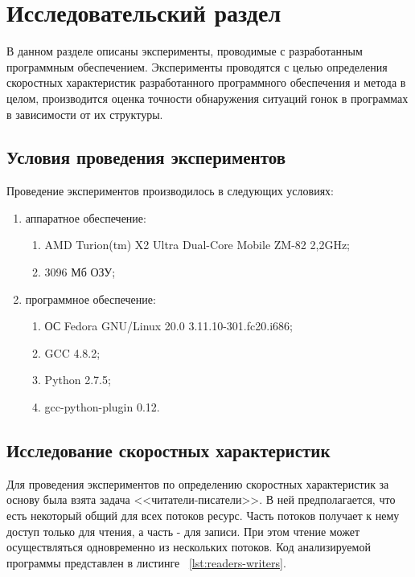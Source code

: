 \chapter{Исследовательский раздел}
\label{cha:research}

В данном разделе описаны эксперименты, проводимые с разработанным программным обеспечением. Эксперименты проводятся с целью определения скоростных характеристик разработанного программного обеспечения и метода в целом, производится оценка точности обнаружения ситуаций гонок в программах в зависимости от их структуры.

\section{Условия проведения экспериментов}

Проведение экспериментов производилось в следующих условиях:
\begin{enumerate}
    \item аппаратное обеспечение:
        \begin{enumerate}
            \item AMD Turion(tm) X2 Ultra Dual-Core Mobile ZM-82 2,2GHz;
            \item 3096 Мб ОЗУ;
        \end{enumerate}
    \item программное обеспечение:
        \begin{enumerate}
            \item ОС Fedora GNU/Linux 20.0 3.11.10-301.fc20.i686;
            \item GCC 4.8.2;
            \item Python 2.7.5;
            \item gcc-python-plugin 0.12.
        \end{enumerate}
\end{enumerate}

\section{Исследование скоростных характеристик}

Для проведения экспериментов по определению скоростных характеристик за основу была взята задача <<читатели-писатели>>. В ней предполагается, что есть некоторый общий для всех потоков ресурс. Часть потоков получает к нему доступ только для чтения, а часть - для записи. При этом чтение может осуществляться одновременно из нескольких потоков. Код анализируемой программы представлен в листинге ~\ref{lst:readers-writers}.

